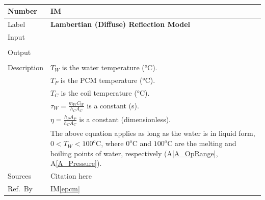\documentclass[12pt]{article}
\newcommand{\colAwidth}{0.13\textwidth}
\newcommand{\colBwidth}{0.82\textwidth}
\newcommand{\aref}[1]{A\ref{#1}}
\newcounter{instnum} %
\newcommand{\iref}[1]{IM\ref{#1}}
\begin{document}
~\newline


\noindent
\begin{minipage}{\textwidth}
	\renewcommand*{\arraystretch}{1.5}
	\begin{tabular}{| p{\colAwidth} | p{\colBwidth}|}
		\hline
		\rowcolor[gray]{0.9}
		Number& IM{instnum}\theinstnum \label{ewat}\\
		\hline
		Label& \bf Lambertian (Diffuse) Reflection Model\\
		\hline
		Input& \\
		& \\
		\hline
		Output& \\
		& \\
		\hline
		Description&$T_W$ is the water temperature (\si{\celsius}).\\
		&$T_P$ is the PCM temperature (\si{\celsius}).\\
		&$T_C$ is the coil temperature (\si{\celsius}).\\
		&$\tau_W = \frac{m_W C_W}{h_C A_C}$ is a constant (\si{\second}).\\
		&$\eta = \frac{h_P A_P}{h_C A_C}$ is a constant (dimensionless).\\
		& The above equation applies as long as the water is in liquid form,
		$0<T_W<100^o\text{C}$, where $0^o\text{C}$ and $100^o\text{C}$ are the 
		melting
		and boiling points of water, respectively (\aref{A_OpRange}, 
		\aref{A_Pressure}).
		\\
		\hline
		Sources& Citation here \\
		\hline
		Ref.\ By & \iref{epcm}\\
		\hline
	\end{tabular}
\end{minipage}\\

~\newline
\end{document}
